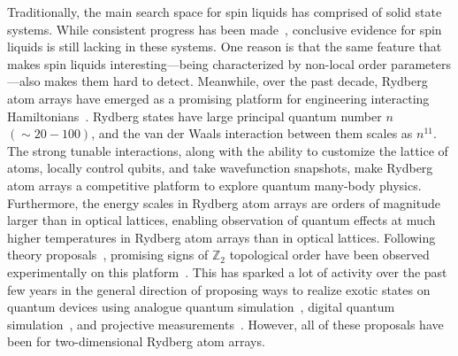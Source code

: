 \documentclass[twocolumn,superscriptaddress,amsmath,amssymb,aps,prx,nofootinbib]{revtex4-2}
\begin{document}
Traditionally, the main search space for spin liquids has comprised of solid state systems. While consistent progress has been made~\cite{savary2017,knolle2019field}, conclusive evidence for spin liquids is still lacking in these systems. One reason is that the same feature that makes spin liquids interesting---being characterized by non-local order parameters---also makes them hard to detect. Meanwhile, over the past decade, Rydberg atom arrays have emerged as a promising platform for engineering interacting Hamiltonians~\cite{weimer2010rydberg,ebadi2021quantum,wu2021concise,saffman2010,lukin2001,labuhn2016,jaksch2000,browaeys2016,barredo2016anatom,beguin2013,barredo2018,semeghini2021, bernien2017probing,bluvstein2022quantum,guardado-sanchez2018probing,keesling2019quantum,levine2019parallel,lienhard2018observing,madjarov2020highfidelity,omran2019generation,schauss2015crystallization,song2021quantum}. Rydberg states have large principal quantum number $n$ $(\sim 20-100)$, and the van der Waals interaction between them scales as $n^{11}$. The strong tunable interactions, along with the ability to customize the lattice of atoms, locally control qubits, and take wavefunction snapshots, make Rydberg atom arrays a competitive platform to explore quantum many-body physics. 
Furthermore, the energy scales in Rydberg atom arrays are orders of magnitude larger than in optical lattices, enabling observation of quantum effects at much higher temperatures in Rydberg atom arrays than in optical lattices.
Following theory proposals~\cite{verresen2021,samajdar2021}, promising signs of $\mathbb{Z}_2$ topological order have been observed experimentally on this platform~\cite{semeghini2021}. This has sparked a lot of activity over the past few years in the general direction of proposing ways to realize exotic states on quantum devices using analogue quantum simulation~\cite{myerson2022construction,slagle2022quantum, giudice2022trimer,zhou2022quantum, tarabunga2023classification, kornjaca2023trimer,ohler2023quantum}, digital quantum simulation~\cite{liu2021methods}, and projective measurements~\cite{tantivasadakarn2022shortest,verresen2021efficiently}. However, all of these proposals have been for two-dimensional Rydberg atom arrays.
\end{document}

